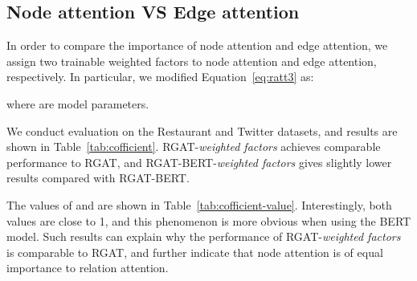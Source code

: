 \documentclass[journal]{IEEEtran}
\begin{document}
	\subsection{{Node attention VS Edge attention}}

	{In order to compare the importance of node attention and edge attention, we assign two trainable weighted factors to node attention and edge attention, respectively. In particular, we modified Equation~\ref{eq:ratt3} as:
		
	where  are model parameters.
	}

	{
	We conduct evaluation on the Restaurant and Twitter datasets, and results are shown in Table~\ref{tab:cofficient}. RGAT-\textit{weighted factors} achieves comparable performance to RGAT, and RGAT-BERT-\textit{weighted factors} gives slightly lower results compared with RGAT-BERT. 
	}
	
	{
	The values of  and  are shown in Table~\ref{tab:cofficient-value}. Interestingly, both values are close to 1, and this phenomenon is more obvious when using the BERT model. Such results can explain why the performance of RGAT-\textit{weighted factors} is comparable  to RGAT, and further indicate that node attention is of equal importance to relation attention.
	}
\end{document}
